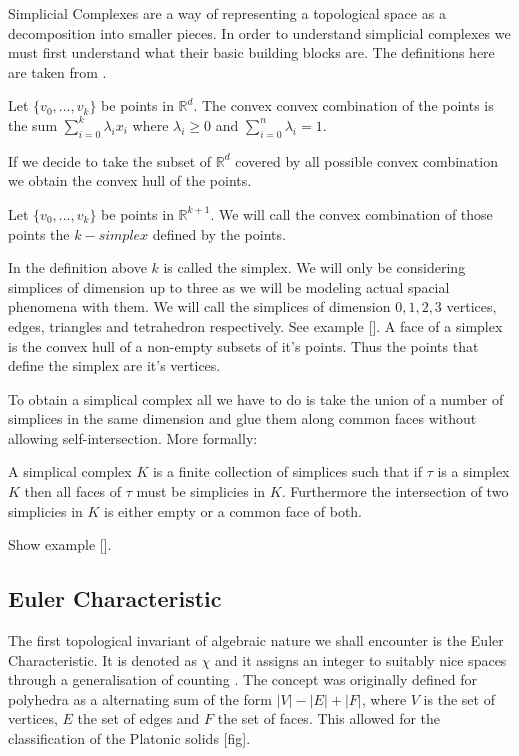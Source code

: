 Simplicial Complexes are a way of representing a topological space as a decomposition into smaller pieces. In order to understand simplicial complexes we must first understand what their basic building blocks are. The definitions here are taken from \cite{comp-topo}.

\begin{defn} Let $\{v_0, ..., v_k\}$ be points in $\mathbb{R}^d$. The convex convex combination of the points is the sum $\sum_{i=0}^k{\lambda_ix_i}$ where $\lambda_i \ge 0$ and $\sum_{i=0}^n{\lambda_i} = 1$.  \end{defn}

If we decide to take the subset of $\mathbb{R}^d$ covered by all possible convex combination we obtain the convex hull of the points. 

\begin{defn} Let $\{v_0, ..., v_k\}$ be points in $\mathbb{R}^{k+1}$. We will call the convex combination of those points the $k-simplex$ defined by the points.  \end{defn}

In the definition above $k$ is called the simplex. We will only be considering simplices of dimension up to three as we will be modeling actual spacial phenomena with them. We will call the simplices of dimension $0, 1, 2, 3$ vertices, edges, triangles and tetrahedron respectively. See example []. A face of a simplex is the convex hull of a non-empty subsets of it's points. Thus the points that define the simplex are it's vertices.

To obtain a simplical complex all we have to do is take the union of a number of simplices in the same dimension and glue them along common faces without allowing self-intersection. More formally:

\begin{defn} A simplical complex $K$ is a finite collection of simplices such that if $\tau$ is a simplex $K$ then all faces of $\tau$ must be simplicies in $K$. Furthermore the intersection of two simplicies in $K$ is either empty or a common face of both.  \end{defn}

Show example [].

\subsection{Euler Characteristic}

The first topological invariant of algebraic nature we shall encounter is the Euler Characteristic. It is denoted as $\chi$ and it assigns an integer to suitably nice spaces through a generalisation of counting \cite{elementary-applied-topology}. The concept was originally defined for polyhedra as a alternating sum of the form $|V| - |E| + |F|$, where $V$ is the set of vertices, $E$ the set of edges and $F$ the set of faces. This allowed for the classification of the Platonic solids [fig].

